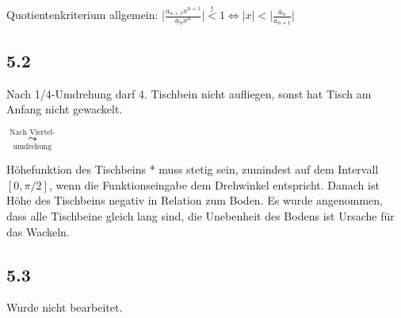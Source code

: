 \documentclass[
    accentcolor=pink,
    boxarc,
    dark_mode,
    logofile=enmpty
]{rubos-tuda-template}
\begin{document}
    Quotientenkriterium allgemein: \(\displaystyle{\bigl|\frac{a_{n+1}x^{n+1}}{a_nx^n}\bigr| \overset{!}{<} 1 \Leftrightarrow |x| < \bigl|\frac{a_n}{a_{n+1}} \bigr|}\)

    \subsection*{5.2}
    Nach 1/4-Umdrehung darf 4. Tischbein nicht aufliegen, sonst hat Tisch am Anfang nicht gewackelt. \\
    $\underset{\text{umdrehung}}{\overset{\text{Nach Viertel-}}{\leadsto}}$

    Höhefunktion des Tischbeins * muss stetig sein, zumindest auf dem Intervall $[0, \pi/2]$, wenn die Funktionseingabe dem Drehwinkel entspricht. Danach ist Höhe des Tischbeins negativ in Relation zum Boden. Es wurde angenommen, dass alle Tischbeine gleich lang sind, die Unebenheit des Bodens ist Ursache für das Wackeln.
    \subsection*{5.3}
    \begin{anmerkung}
        Wurde nicht bearbeitet.
    \end{anmerkung}
\end{document}
